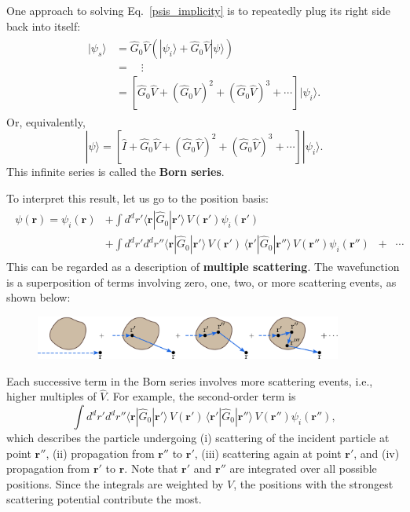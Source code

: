 \documentclass[prx,12pt]{revtex4-2}
\begin{document}
One approach to solving Eq.~\eqref{psis_implicity} is to repeatedly
plug its right side back into itself:
\begin{align}
  \begin{aligned}
    |\psi_s\rangle &= \hat{G}_0 \hat{V} \left(|\psi_i\rangle + \hat{G}_0 \hat{V}|\psi\rangle\right) \\
    &= \quad \vdots \\
    &= \left[\hat{G}_0 \hat{V} + (\hat{G}_0 \hat{V})^2 + (\hat{G}_0 \hat{V})^3 + \cdots\right]|\psi_i\rangle.
  \end{aligned}
\end{align}
Or, equivalently,
\begin{equation}
  |\psi\rangle
  = \left[\hat{I} + \hat{G}_0 \hat{V} + (\hat{G}_0 \hat{V})^2 + (\hat{G}_0 \hat{V})^3 + \cdots\right]|\psi_i\rangle.
  \label{bornseries}
\end{equation}
This infinite series is called the \textbf{Born series}.

To interpret this result, let us go to the position basis:
\begin{align}
  \begin{aligned}\psi(\mathbf{r}) = \psi_i(\mathbf{r}) &+ \int d^dr' \langle \mathbf{r} | \hat{G}_0 |\mathbf{r}'\rangle\, V(\mathbf{r}') \psi_i(\mathbf{r}') \\ &+ \int d^dr' d^dr'' \langle \mathbf{r} | \hat{G}_0 |\mathbf{r}'\rangle\, V(\mathbf{r}') \, \langle \mathbf{r}' | \hat{G}_0 |\mathbf{r}''\rangle \, V(\mathbf{r}'') \psi_i(\mathbf{r}'') \;\; + \;\;\cdots\end{aligned}
    \label{Bornposition}
\end{align}
This can be regarded as a description of \textbf{multiple scattering}.
The wavefunction is a superposition of terms involving zero, one, two,
or more scattering events, as shown below:

\begin{figure}[h!]
  \centering\includegraphics[width=0.9\textwidth]{bornseries}
\end{figure}

\noindent
Each successive term in the Born series involves more scattering
events, i.e., higher multiples of $\hat{V}$.  For example, the
second-order term is
\begin{equation*}
  \int d^dr' d^dr'' \langle \mathbf{r} | \hat{G}_0 |\mathbf{r}'\rangle\, V(\mathbf{r}') \, \langle \mathbf{r}' | \hat{G}_0 |\mathbf{r}''\rangle \, V(\mathbf{r}'') \psi_i(\mathbf{r}''),
\end{equation*}
which describes the particle undergoing (i) scattering of the incident
particle at point $\mathbf{r}''$, (ii) propagation from $\mathbf{r}''$
to $\mathbf{r}'$, (iii) scattering again at point $\mathbf{r}'$, and
(iv) propagation from $\mathbf{r}'$ to $\mathbf{r}$.  Note that
$\mathbf{r}'$ and $\mathbf{r}''$ are integrated over all possible
positions.  Since the integrals are weighted by $V$, the positions
with the strongest scattering potential contribute the most.
\end{document}
